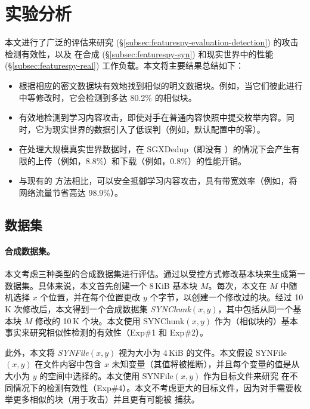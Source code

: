 \section{实验分析}
\label{sec:featurespy-evaluation}


本文进行了广泛的评估来研究 \sysnameF (\S\ref{subsec:featurespy-evaluation-detection}) 的攻击检测有效性，以及 \prototype 在合成 (\S\ref{subsec:featurespy-syn}) 和现实世界中的性能(\S\ref{subsec:featurespy-real}) 工作负载。本文将主要结果总结如下：

\begin{itemize}[leftmargin=*]
\item \sysnameF 根据相应的密文数据块有效地找到相似的明文数据块。例如，当它们彼此进行中等修改时，它会检测到多达 80.2\% 的相似块。
\item \sysnameF 有效地检测到学习内容攻击，即使对手在普通内容快照中提交枚举内容。同时，它为现实世界的数据引入了低误判（例如，默认配置中的零）。
\item \prototype 在处理大规模真实世界数据时，在 SGXDedup（即没有 \sysnameF）的情况下会产生有限的上传（例如，8.8\%）和下载（例如，0.8\%）的性能开销。
\item 与现有的 \cite{harnik10, li15} 方法相比，可以安全抵御学习内容攻击，\prototype 具有带宽效率（例如，将网络流量节省高达 98.9\%）。
\end{itemize}


\subsection{数据集}
\label{subsec:featurespy-datasets}

\paragraph*{合成数据集。}

本文考虑三种类型的合成数据集进行评估。通过以受控方式修改基本块来生成第一数据集。具体来说，本文首先创建一个 8\,KiB 基本块 $M$。每次，本文在 $M$ 中随机选择 $x$ 个位置，并在每个位置更改 $y$ 个字节，以创建一个修改过的块。经过 10\,K 次修改后，本文得到一个合成数据集 {\em SYNChunk}$(x, y)$，其中包括从同一个基本块 $M$ 修改的 10\,K 个块。本文使用 SYNChunk$(x, y)$ 作为（相似块的）基本事实来研究相似性检测的有效性（Exp\#1 和 Exp\#2）。

此外，本文将 {\em SYNFile}$(x, y)$ 视为大小为 4\,KiB 的文件。本文假设 SYNFile$(x, y)$ 在文件内容中包含 $x$ 未知变量（其值将被推断），并且每个变量的值是从大小为 $y$ 的空间中选择的。本文使用 SYNFile$(x, y)$ 作为目标文件来研究 \sysnameF 在不同情况下的检测有效性（Exp\#4）。本文不考虑更大的目标文件，因为对手需要枚举更多相似的块（用于攻击）并且更有可能被 \sysnameF 捕获。

